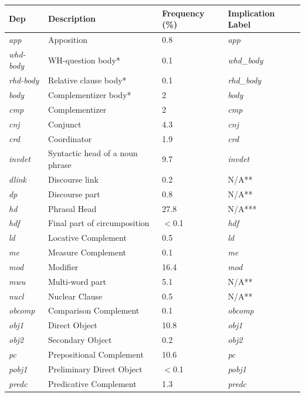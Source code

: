 \begin{table}
\begin{tabularx}{1\linewidth}{ussU}
      \textbf{Dep} & \textbf{Description} & \textbf{Frequency} (\%) & \textbf{Implication Label}\\
      \toprule
      \textit{app} & Apposition & 0.8 & \textit{app}\\
      \textit{whd-body} & WH-question body* & 0.1 & \textit{whd\_body}\\
      \textit{rhd-body} & Relative clause body* &0.1& \textit{rhd\_body}\\
      \textit{body} & Complementizer body* &2& \textit{body}\\
      \textit{cmp} & Complementizer & 2& \textit{cmp}\\
      \textit{cnj} & Conjunct &4.3& \textit{cnj}\\
      \textit{crd} & Coordinator &1.9& \textit{crd}\\
      \textit{invdet} & Syntactic head of a noun phrase &9.7& \textit{invdet}\\
      \textit{dlink} & Discourse link & 0.2 & N/A**\\
      \textit{dp} & Discourse part & 0.8 & N/A**\\
      \textit{hd} & Phrasal Head & 27.8 & N/A*** \\
      \textit{hdf} & Final part of circumposition & $<$0.1& \textit{hdf}\\
      \textit{ld} & Locative Complement &0.5& \textit{ld}\\
      \textit{me} & Measure Complement &0.1& \textit{me}\\
      \textit{mod} & Modifier &16.4& \textit{mod}\\
      \textit{mwu} & Multi-word part &5.1& N/A**\\
      \textit{nucl} & Nuclear Clause &0.5& N/A**\\
      \textit{obcomp} & Comparison Complement &0.1& \textit{obcomp}\\      
      \textit{obj1} & Direct Object &10.8& \textit{obj1}\\
      \textit{obj2} & Secondary Object &0.2& \textit{obj2}\\
      \textit{pc} & Prepositional Complement &10.6& \textit{pc}\\      
      \textit{pobj1} & Preliminary Direct Object &$<$0.1& \textit{pobj1}\\      
      \textit{predc} & Predicative Complement &1.3& \textit{predc}\\      

\end{tabularx}
\end{table}
